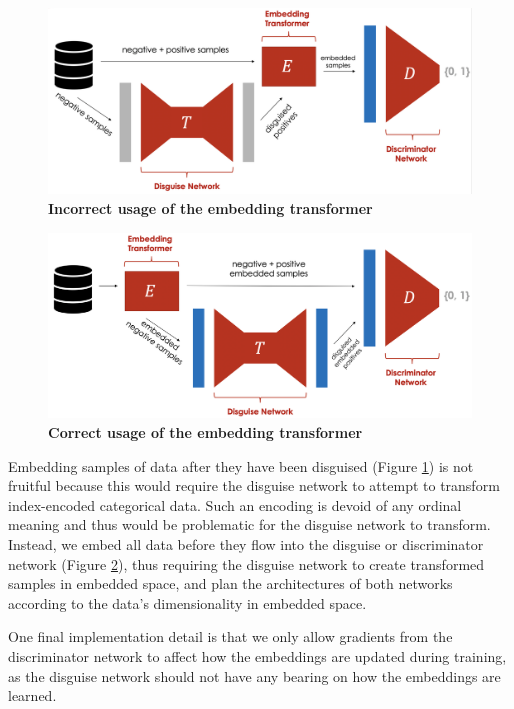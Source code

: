 \documentclass{proc}
\begin{document}
\begin{figure}[h!]
		\includegraphics*[scale=0.2]{../figures/embeddings-incorrect.png}
		\caption{\textbf{Incorrect usage of the embedding transformer}}
		\label{fig:embeddings-incorrect}
\end{figure}

\begin{figure}[h!]
		\includegraphics*[scale=0.2]{../figures/embeddings-correct.png}
		\caption{\textbf{Correct usage of the embedding transformer}}
		\label{fig:embeddings-correct}
\end{figure}

Embedding samples of data after they have been disguised (Figure \ref{fig:embeddings-incorrect}) is not fruitful because this would require the disguise network to attempt to transform index-encoded categorical data. Such an encoding is devoid of any ordinal meaning and thus would be problematic for the disguise network to transform. Instead, we embed all data before they flow into the disguise or discriminator network (Figure \ref{fig:embeddings-correct}), thus requiring the disguise network to create transformed samples in embedded space, and plan the architectures of both networks according to the data's dimensionality in embedded space. 

One final implementation detail is that we only allow gradients from the discriminator network to affect how the embeddings are updated during training, as the disguise network should not have any bearing on how the embeddings are learned.
\end{document}
